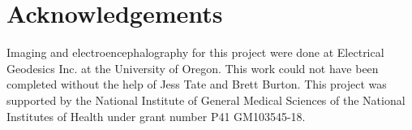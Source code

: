%   

\section{Acknowledgements}
\label{sec:acknowl}

Imaging and electroencephalography for this project were done at Electrical Geodesics Inc. at the University of Oregon. This work could not have been completed without the help of Jess Tate and Brett Burton. This project was supported by the National Institute of General Medical Sciences of the National Institutes of Health under grant number P41 GM103545-18. 